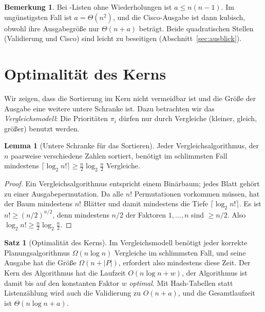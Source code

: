\documentclass[a4paper,12pt, twoside]{report}
\theoremstyle{definition}
\newtheorem{satz}{Satz}
\newtheorem{lemma}{Lemma}
\newtheorem{bemerkung}{Bemerkung}
\newcommand{\code}[1]{\texttt{\detokenize{#1}}}
\begin{document}
\begin{bemerkung}
	Bei \code{access}-Listen ohne Wiederholungen ist $a \le n(n-1)$. Im ungünstigsten Fall ist $a = \Theta(n^2)$, und die Cisco-Ausgabe ist dann kubisch, obwohl ihre Ausgabegröße nur $\Theta(n + a)$ beträgt. Beide quadratischen Stellen (Validierung und Cisco) sind leicht zu beseitigen (Abschnitt~\ref{sec:ausblick}).
\end{bemerkung}

\section{Optimalität des Kerns}

Wir zeigen, dass die Sortierung im Kern nicht vermeidbar ist und die Größe der Ausgabe eine weitere untere Schranke ist. Dazu betrachten wir das \emph{Vergleichsmodell}: Die Prioritäten $\pi_i$ dürfen nur durch Vergleiche (kleiner, gleich, größer) benutzt werden.

\begin{lemma}[Untere Schranke für das Sortieren]
\label{lem:sort}
	Jeder Vergleichsalgorithmus, der $n$ paarweise verschiedene Zahlen sortiert, benötigt im schlimmsten Fall mindestens $\lceil\log_2 n!\rceil \ge \frac{n}{2}\log_2\frac{n}{2}$ Vergleiche.
\end{lemma}

\begin{proof}
	Ein Vergleichsalgorithmus entspricht einem Binärbaum; jedes Blatt gehört zu einer Ausgabepermutation. Da alle $n!$ Permutationen vorkommen müssen, hat der Baum mindestens $n!$ Blätter und damit mindestens die Tiefe $\lceil\log_2 n!\rceil$. Es ist $n! \ge (n/2)^{n/2}$, denn mindestens $n/2$ der Faktoren $1,\ldots,n$ sind $\ge n/2$. Also $\log_2 n! \ge \frac{n}{2}\log_2 \frac{n}{2}$.
\end{proof}

\begin{satz}[Optimalität des Kerns]
\label{satz:optimal}
	Im Vergleichsmodell benötigt jeder korrekte Planungsalgorithmus $\Omega(n\log n)$ Vergleiche im schlimmsten Fall, und seine Ausgabe hat die Größe $\Omega(n + |P|)$, erfordert also mindestens diese Zeit. Der Kern des Algorithmus hat die Laufzeit $O(n\log n + w)$, der Algorithmus ist damit bis auf den konstanten Faktor $w$ \emph{optimal}. Mit Hash-Tabellen statt Listenzählung wird auch die Validierung zu $O(n+a)$, und die Gesamtlaufzeit ist $\Theta(n\log n + a)$.
\end{satz}
\end{document}

